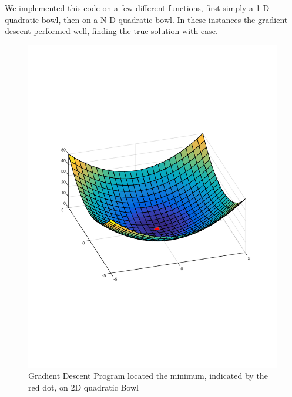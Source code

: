 \documentclass{article}
\begin{document}
We implemented this code on a few different functions, first simply a 1-D quadratic bowl, then on a N-D quadratic bowl. In these instances the gradient descent performed well, finding the true solution with ease.  
\begin{figure}[H]
\center
\includegraphics[scale =.4]{2DQuadBowl.pdf}
\caption{Gradient Descent Program located the minimum, indicated by the red dot, on 2D quadratic Bowl}
\end{figure}
\end{document}
